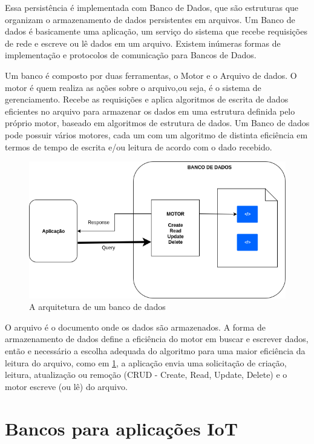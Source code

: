 Essa persistência é implementada com Banco de Dados, que são estruturas que organizam o armazenamento de dados persistentes em arquivos. Um Banco de dados é  basicamente uma aplicação, um serviço do sistema que recebe requisições de rede e escreve ou lê dados em um arquivo. Existem inúmeras formas de implementação e protocolos de comunicação para Bancos de Dados.

Um banco é composto por duas ferramentas, o Motor e o Arquivo de dados. O motor é quem realiza as ações sobre o arquivo,ou seja, é o sistema de gerenciamento. Recebe as requisições e aplica algoritmos de escrita de dados eficientes no arquivo para armazenar os dados em uma estrutura definida pelo próprio motor, baseado em algoritmos de estrutura de dados. Um Banco de dados pode possuir vários motores, cada um com um algoritmo de distinta eficiência em termos de tempo de escrita e/ou leitura de acordo com o dado recebido.

\begin{figure}[h!]
\centering
\includegraphics[width=12cm]{./02_Capitulos/02_Cap3/figures/Database_Arch}
\caption{A arquitetura de um banco de dados}
\label{fig:3.3.5/database_arch}
\end{figure}

O arquivo é o documento onde os dados são armazenados. A forma de armazenamento de dados define a eficiência do motor em buscar e escrever dados, então e necessário a escolha adequada do algoritmo para uma maior eficiência da leitura do arquivo, como em \ref{fig:3.3.5/database_arch}, a aplicação envia uma solicitação de criação, leitura, atualização ou remoção (CRUD - Create, Read, Update, Delete) e o motor escreve (ou lê) do arquivo.


 
\section{Bancos para aplicações IoT}
\label{section:bancos_IoT}



